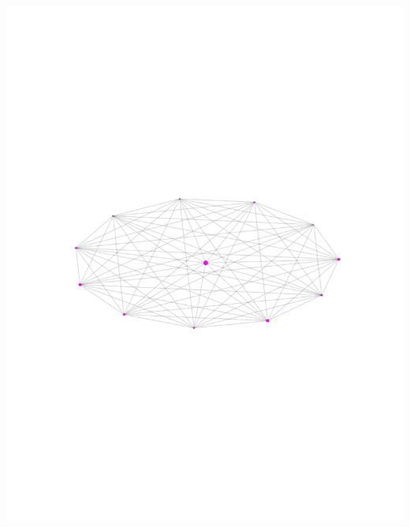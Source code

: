\documentclass[landscape,paperwidth=70in,paperheight=46in,fontscale=0.225]{baposter} %
\begin{document}
\begin{poster}
{\begin{minipage}{0.3\linewidth}
\includegraphics[scale=0.3]{figures/graph_community.pdf} 

\end{minipage}
\hfill
\begin{minipage}{0.3\linewidth}


\end{minipage}}
\end{poster}
\end{document}

